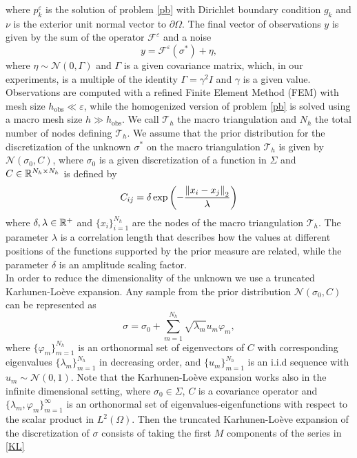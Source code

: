 \documentclass[10pt]{article}
\begin{document}
where $p_k^{\varepsilon}$ is the solution of problem \eqref{pb} with Dirichlet boundary condition $g_k$ and $\nu$ is the exterior unit normal vector to $\partial \Omega$. The final vector of observations $y$ is given by the sum of the operator $\mathcal{F}^{\varepsilon}$ and a noise
\[ y = \mathcal{F}^{\varepsilon}(\sigma^*) + \eta, \]
where $\eta \sim \mathcal{N}(0, \Gamma)$ and $\Gamma$ is a given covariance matrix, which, in our experiments, is a multiple of the identity $\Gamma = \gamma^2 I$ and $\gamma$ is a given value. Observations are computed with a refined Finite Element Method (FEM) with mesh size $h_{\mathrm{obs}} \ll \varepsilon$, while the homogenized version of problem \eqref{pb} is solved using a macro mesh size $h \gg h_{\mathrm{obs}}$. We call $\mathcal{T}_h$ the macro triangulation and $N_h$ the total number of nodes defining $\mathcal{T}_h$. We assume that the prior distribution for the discretization of the unknown $\sigma^*$ on the macro triangulation $\mathcal{T}_h$ is given by $\mathcal{N}(\sigma_0, C)$, where $\sigma_0$ is a given discretization of a function in $\Sigma$ and $C \in \mathbb{R}^{N_h \times N_h}$ is defined by
\begin{equation*}
C_{ij} = \delta \exp \left ( - \frac{\left\|x_i - x_j\right\|_2}{\lambda} \right )
\end{equation*}
where $\delta, \lambda \in \mathbb{R}^+$ and $\{ x_i \}_{i=1}^{N_h}$ are the nodes of the macro triangulation $\mathcal{T}_h$. The parameter $\lambda$ is a correlation length that describes how the values at different positions of the functions supported by the prior measure are related, while the parameter $\delta$ is an amplitude scaling factor. \\
In order to reduce the dimensionality of the unknown we use a truncated Karhunen-Lo\`eve expansion. Any sample from the prior distribution $\mathcal{N}(\sigma_0,C)$ can be represented as
\begin{equation}
\label{KL}
\sigma = \sigma_0 + \sum_{m=1}^{N_h} \sqrt{\lambda_m} u_m \varphi_m,
\end{equation}
where $\{ \varphi_m \}_{m=1}^{N_h}$ is an orthonormal set of eigenvectors of $C$ with corresponding eigenvalues $\{ \lambda_m \}_{m=1}^{N_h}$ in decreasing order, and $\{ u_m \}_{m=1}^{N_h}$ is an i.i.d sequence with $u_m \sim \mathcal{N}(0,1)$. Note that the Karhunen-Lo\`eve expansion works also in the infinite dimensional setting, where $\sigma_0 \in \Sigma$, $C$ is a covariance operator and $\{ \lambda_m, \varphi_m \}_{m=1}^{\infty}$ is an orthonormal set of eigenvalues-eigenfunctions with respect to the scalar product in $L^2(\Omega)$. Then the truncated Karhunen-Lo\`eve expansion of the discretization of $\sigma$ consists of taking the first $M$ components of the series in \eqref{KL}
\end{document}
